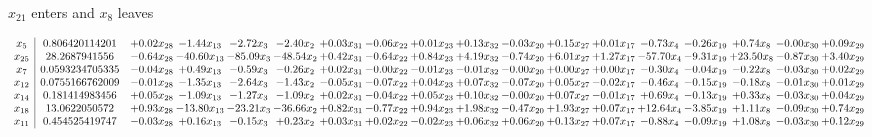 \documentclass[9pt]{article}
\begin{document}
 $ x_{21} $ enters and $ x_{8} $ leaves 

 \[\begin{array}{c| c c@{\hskip 2pt} c@{\hskip 2pt} c@{\hskip 2pt} c@{\hskip 2pt} c@{\hskip 2pt} c@{\hskip 2pt} c@{\hskip 2pt} c@{\hskip 2pt} c@{\hskip 2pt} c@{\hskip 2pt} c@{\hskip 2pt} c@{\hskip 2pt} c@{\hskip 2pt} c@{\hskip 2pt} c@{\hskip 2pt} c@{\hskip 2pt} }
 x_{5}   &  0.806420114201 & +  0.02 x_{28} & -1.44 x_{13} & -2.72 x_{3} & -2.40 x_{2} & +  0.03 x_{31} & -0.06 x_{22} & +  0.01 x_{23} & +  0.13 x_{32} & -0.03 x_{20} & +  0.15 x_{27} & +  0.01 x_{17} & -0.73 x_{4} & -0.26 x_{19} & +  0.74 x_{8} & -0.00 x_{30} & +  0.09 x_{29}\\
 x_{25}   &  28.2687941556 & -0.64 x_{28} & -40.60 x_{13} & -85.09 x_{3} & -48.54 x_{2} & +  0.42 x_{31} & -0.64 x_{22} & +  0.84 x_{23} & +  4.19 x_{32} & -0.74 x_{20} & +  6.01 x_{27} & +  1.27 x_{17} & -57.70 x_{4} & -9.31 x_{19} & + 23.50 x_{8} & -0.87 x_{30} & +  3.40 x_{29}\\
 x_{7}   &  0.0593234705335 & -0.04 x_{28} & +  0.49 x_{13} & -0.59 x_{3} & -0.26 x_{2} & +  0.02 x_{31} & -0.00 x_{22} & -0.01 x_{23} & -0.01 x_{32} & -0.00 x_{20} & +  0.00 x_{27} & +  0.00 x_{17} & -0.30 x_{4} & -0.04 x_{19} & -0.22 x_{8} & -0.03 x_{30} & +  0.02 x_{29}\\
 x_{12}   &  0.0755166762009 & -0.01 x_{28} & -1.35 x_{13} & -2.64 x_{3} & -1.43 x_{2} & -0.05 x_{31} & -0.07 x_{22} & +  0.04 x_{23} & +  0.07 x_{32} & -0.07 x_{20} & +  0.05 x_{27} & -0.02 x_{17} & -0.46 x_{4} & -0.15 x_{19} & -0.18 x_{8} & -0.01 x_{30} & +  0.01 x_{29}\\
 x_{14}   &  0.181414983456 & +  0.05 x_{28} & -1.09 x_{13} & -1.27 x_{3} & -1.09 x_{2} & +  0.02 x_{31} & -0.04 x_{22} & +  0.05 x_{23} & +  0.10 x_{32} & -0.00 x_{20} & +  0.07 x_{27} & -0.01 x_{17} & +  0.69 x_{4} & -0.13 x_{19} & +  0.33 x_{8} & -0.03 x_{30} & +  0.04 x_{29}\\
 x_{18}   &  13.0622050572 & +  0.93 x_{28} & -13.80 x_{13} & -23.21 x_{3} & -36.66 x_{2} & +  0.82 x_{31} & -0.77 x_{22} & +  0.94 x_{23} & +  1.98 x_{32} & -0.47 x_{20} & +  1.93 x_{27} & +  0.07 x_{17} & + 12.64 x_{4} & -3.85 x_{19} & +  1.11 x_{8} & -0.09 x_{30} & +  0.74 x_{29}\\
 x_{11}   &  0.454525419747 & -0.03 x_{28} & +  0.16 x_{13} & -0.15 x_{3} & +  0.23 x_{2} & +  0.03 x_{31} & +  0.02 x_{22} & -0.02 x_{23} & +  0.06 x_{32} & +  0.06 x_{20} & +  0.13 x_{27} & +  0.07 x_{17} & -0.88 x_{4} & -0.09 x_{19} & +  1.08 x_{8} & -0.03 x_{30} & +  0.12 x_{29}\\

\end{array}\]
\end{document}
